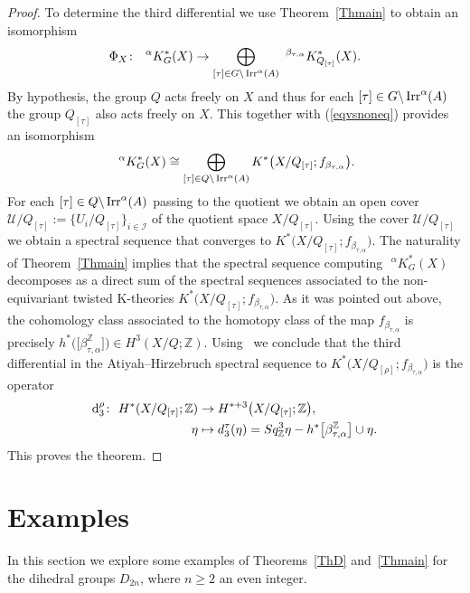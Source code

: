 \documentclass[10pt,a4paper]{amsart}
\def\Z{\mathbb{Z}}
\newcommand{\cali}{\mathcal{I}}
\newcommand{\calu}{\mathcal{U}}
\DeclareMathOperator{\Irr}{\textup{Irr}}
\theoremstyle{definition}
\numberwithin{equation}{section}
\begin{document}
\begin{proof}
To determine the third differential we use Theorem~\ref{Thmain} to obtain an isomorphism
\begin{gather*}
\Phi_{X}\colon \ \phantom{i}^{\alpha}K_{G}^{\ast}(X)\rightarrow
\bigoplus_{[\tau]\in G\backslash \Irr^{\alpha}(A)}\phantom{i}
^{\beta_{\tau,\alpha}}K^{\ast}_{Q_{[\tau]}}(X).
\end{gather*}
By hypothesis, the group $Q$ acts freely on $X$ and thus for each $[\tau]\in G\backslash \Irr^{\alpha}(A)$
the group $Q_{[\tau]}$ also acts freely on $X$. This together with (\ref{eqvsnoneq})
provides an isomorphism
\begin{gather*}
\phantom{i}^{\alpha}K_{G}^{\ast}(X)\cong
\bigoplus_{[\tau]\in Q \backslash \Irr^{\alpha}(A)} K^{*}\big(X/Q_{[\tau]}; f_{\beta_{\tau,\alpha}}\big).
\end{gather*}
For each $[\tau]\in Q \backslash \Irr^{\alpha}(A)$ passing to the quotient we obtain an open cover
$\calu/Q_{[\tau]}:=\!\big\{U_{i}/Q_{[\tau]}\big\}_{i\in \cali}$ of the quotient space $X/Q_{[\tau]}$. Using the
cover $\calu/Q_{[\tau]}$ we obtain a spectral sequence that converges to
$K^{*}\big(X/Q_{[\tau]}; f_{\beta_{\tau,\alpha}}\big)$. The naturality of Theorem~\ref{Thmain} implies that
the spectral sequence computing $\phantom{i}^{\alpha}K_{G}^{\ast}(X)$ decomposes as a direct sum
of the spectral sequences associated to the non-equivariant twisted K-theories
$K^{*}\big(X/Q_{[\tau]}; f_{\beta_{\tau,\alpha}}\big)$. As it was pointed out above,
the cohomology class associated to the homotopy class of the map $f_{\beta_{\tau,\alpha}}$ is precisely
$h^{*}\big(\big[\beta_{\tau,\alpha}^\Z\big]\big)\in H^{3}(X/Q;\Z)$. \mbox{Using}~\cite[Proposition~4.6]{Atiyah-Segal2} we conclude
that the third differential in the Atiyah--Hirzebruch spectral sequence to
$K^{*}\big(X/Q_{[\rho]}; f_{\beta_{\tau,\alpha}}\big)$ is the operator
\begin{align*}
{\rm d}^\rho_3\colon\ H^{*}(X/Q_{[\tau]};\Z) &\to H^{*+3}\big(X/Q_{[\tau]};\Z\big),
\\
\eta&\mapsto d^\tau_3(\eta)= Sq^3_\Z \eta - h^*\big[\beta_{\tau,\alpha}^\Z\big] \cup \eta.
\end{align*}
This proves the theorem.
\end{proof}

\section{Examples}\label{Section 5}

In this section we explore some examples of Theorems~\ref{ThD} and~\ref{Thmain}
for the dihedral groups $D_{2n}$, where $n\ge 2$ an even integer.
\end{document}
